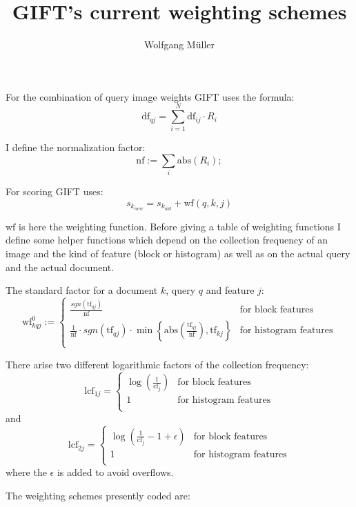 \documentclass[10pt]{article}
\newcommand{\df}{\mathrm{df}}
\newcommand{\cf}{\mathrm{cf}}
\newcommand{\wf}{\mathrm{wf}}
\newcommand{\nf}{\mathrm{nf}}
\newcommand{\tf}{\mathrm{tf}}
\newcommand{\lf}{\mathrm{lcf}}
\newcommand{\abs}{\mathrm{abs}}
\begin{document}
\title{GIFT's current weighting schemes}
\author{Wolfgang M\"uller}

\maketitle

For the combination of query image weights GIFT uses the formula:
\[
	\df_{qj}=\sum_{i=1}^N \df_{ij}\cdot R_i
\]

I define the normalization factor:
\[
	\nf:=\sum_i \abs(R_i);
\]

For scoring GIFT uses:
\[
	s_{k_{new}}=s_{k_{old}} + \wf(q,k,j)
\]

$\wf$ is here the weighting function. Before giving a table of
weighting functions I define some helper functions which depend on the
collection frequency of an image and  the kind of feature (block or
histogram) as well as on the actual query and the actual document.

The standard factor for a document $k$, 
query $q$ and feature $j$:
\[
	\wf^{0}_{kqj}:=
	\begin{cases}	
		\frac{sgn(\tf_{qj})}{\nf}&\text{for block features}\\

		\frac 1{\nf}\cdot sgn(\tf_{qj})\cdot \min
		\left\{\abs\left(\frac{\tf_{qj}}{\nf}\right),
		\tf_{kj}\right\}& \text{for histogram features}\\

	\end{cases}
\]

There arise two different logarithmic factors of the collection frequency:
\[
	\lf_{1j}=\begin{cases}
		\log(\frac 1{\cf_j})& \text{for block features}\\
		1 & \text{for histogram features}\\
		\end{cases}
\]
and
\[
	\lf_{2j}=\begin{cases}
		\log(\frac 1{\cf_j}-1+\epsilon)& \text{for block features}\\
		1 & \text{for histogram features}\\
		\end{cases}
\]
where the $\epsilon$ is added to avoid overflows.

The weighting schemes presently coded are:
\end{document}
